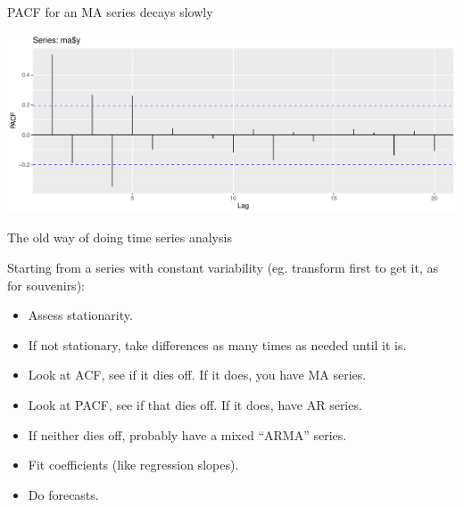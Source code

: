 \documentclass[
  ignorenonframetext,
]{beamer}
\newenvironment{Shaded}{\begin{snugshade}}{\end{snugshade}}
\newcommand{\DataTypeTok}[1]{\textcolor[rgb]{0.13,0.29,0.53}{#1}}
\newcommand{\KeywordTok}[1]{\textcolor[rgb]{0.13,0.29,0.53}{\textbf{#1}}}
\newcommand{\NormalTok}[1]{#1}
\newcommand{\OperatorTok}[1]{\textcolor[rgb]{0.81,0.36,0.00}{\textbf{#1}}}
\newcommand{\StringTok}[1]{\textcolor[rgb]{0.31,0.60,0.02}{#1}}
\providecommand{\tightlist}{%
  \setlength{\itemsep}{0pt}\setlength{\parskip}{0pt}}
\begin{document}
\begin{frame}[fragile]{PACF for an MA series decays slowly}
\protect\hypertarget{pacf-for-an-ma-series-decays-slowly}{}

\begin{Shaded}
\end{Shaded}

\includegraphics{slides_d29_files/figure-beamer/unnamed-chunk-560-1.pdf}

\end{frame}

\begin{frame}{The old way of doing time series analysis}
\protect\hypertarget{the-old-way-of-doing-time-series-analysis}{}

Starting from a series with constant variability (eg. transform first to
get it, as for souvenirs):

\begin{itemize}
\tightlist
\item
  Assess stationarity.
\item
  If not stationary, take differences as many times as needed until it
  is.
\item
  Look at ACF, see if it dies off. If it does, you have MA series.
\item
  Look at PACF, see if that dies off. If it does, have AR series.
\item
  If neither dies off, probably have a mixed ``ARMA'' series.
\item
  Fit coefficients (like regression slopes).
\item
  Do forecasts.
\end{itemize}

\end{frame}
\end{document}
